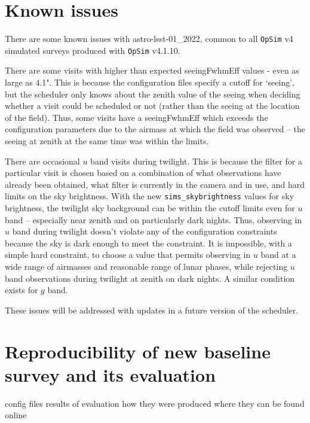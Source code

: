 \documentclass[DM,lsstdraft,authoryear,toc]{lsstdoc}
\newcommand{\opsim}{\texttt{OpSim}\xspace}
\newcommand{\simsky}{\texttt{sims\_skybrightness}\xspace}
\begin{document}
\section{Known issues}

There are some known issues with astro-lsst-01\_2022, common to all \opsim v4 simulated surveys produced with \opsim v4.1.10. 

There are some visits with higher than expected seeingFwhmEff values - even as large as 4.1". This is because the configuration files specify a cutoff for `seeing', but the scheduler only knows about the zenith value of the seeing when deciding whether a visit could be scheduled or not (rather than the seeing at the location of the field). Thus, some visits have a seeingFwhmEff which exceeds the configuration parameters due to the airmass at which the field was observed -- the seeing at zenith at the same time was within the limits.

There are occasional $u$ band visits during twilight. This is because the filter for a particular visit is chosen based on a combination of what observations have already been obtained, what filter is currently in the camera and in use, and hard limits on the sky brightness. With the new \simsky values for sky brightness, the twilight sky background can be within the cutoff limits even for $u$ band -- especially near zenith and on particularly dark nights. Thus, observing in $u$ band during twilight doesn't violate any of the configuration constraints because the sky is dark enough to meet the constraint. It is impossible, with a simple hard constraint, to choose a value that permits observing in $u$ band at a wide range of airmasses and reasonable range of lunar phases, while rejecting $u$ band observations during twilight at zenith on dark nights. A similar condition exists for $g$ band.

These issues will be addressed with updates in a future version of the scheduler. 

\section{Reproducibility of new baseline survey and its evaluation}

config files
results of evaluation
how they were produced
where they can be found online


\end{document}
